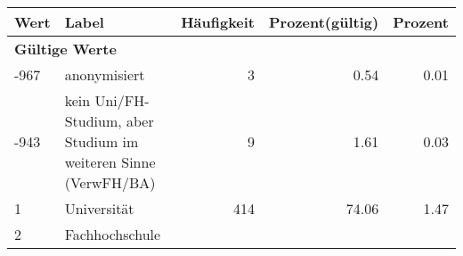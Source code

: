      \begin{longtable}{lXrrr}
     \toprule
     \textbf{Wert} & \textbf{Label} & \textbf{Häufigkeit} & \textbf{Prozent(gültig)} & \textbf{Prozent} \\
     \endhead
     \midrule
     \multicolumn{5}{l}{\textbf{Gültige Werte}}\\

     -967 &
     \multicolumn{1}{X}{ anonymisiert   } &


       \num{3} &
       \num[round-mode=places,round-precision=2]{0.54} &
         \num[round-mode=places,round-precision=2]{0.01} \\

     -943 &
     \multicolumn{1}{X}{ kein Uni/FH-Studium, aber Studium im weiteren Sinne (VerwFH/BA)   } &


       \num{9} &
       \num[round-mode=places,round-precision=2]{1.61} &
         \num[round-mode=places,round-precision=2]{0.03} \\

     1 &
     \multicolumn{1}{X}{ Universität   } &


       \num{414} &
       \num[round-mode=places,round-precision=2]{74.06} &
         \num[round-mode=places,round-precision=2]{1.47} \\

     2 &
     \multicolumn{1}{X}{ Fachhochschule   } &



\end{longtable}
